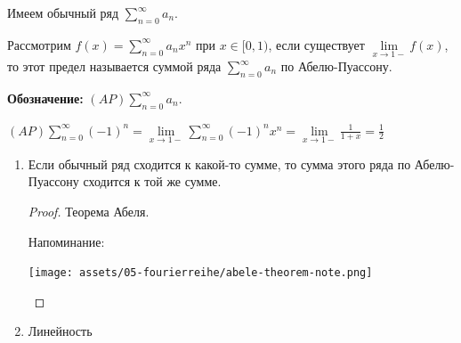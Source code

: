 \begin{definition}
    Имеем обычный ряд $\sum\limits_{n=0}^\infty a_n$.

    Рассмотрим $f(x) = \sum\limits_{n=0}^\infty a_n x^n$ при $x \in [0, 1)$, если существует $\lim\limits_{x \to 1-} f(x)$, то этот предел называется суммой ряда $\sum\limits_{n=0}^\infty a_n$ по Абелю-Пуассону.

    \textbf{Обозначение:} $(AP) \sum\limits_{n=0}^\infty a_n$.
\end{definition}

\begin{example}
    $(AP) \sum\limits_{n=0}^\infty (-1)^n = \lim\limits_{x \to 1-} \sum\limits_{n=0}^\infty (-1)^n x^n = \lim\limits_{x\to 1-} \frac{1}{1 + x} = \frac{1}{2}$
\end{example}

\begin{properties}
    \begin{enumerate}
        \item {

            Если обычный ряд сходится к какой-то сумме, то сумма этого ряда по Абелю-Пуассону сходится к той же сумме.

            \begin{proof}
                Теорема Абеля.

                Напоминание:

                \begin{center}
                    \texttt{[image: assets/05-fourierreihe/abele-theorem-note.png]}
                \end{center}
            \end{proof}
        }
        \item {
            Линейность
        }
    \end{enumerate}
\end{properties}

